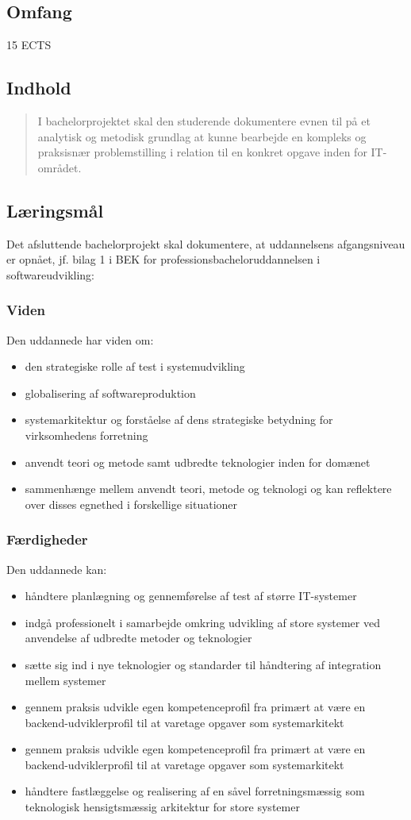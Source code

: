 \documentclass{article}
\begin{document}
\subsection{Omfang}
15 ECTS

\subsection{Indhold}
\begin{quote}
I bachelorprojektet skal den studerende dokumentere evnen til på et
analytisk og metodisk grundlag at kunne bearbejde en kompleks og praksisnær
problemstilling i relation til en konkret opgave inden for IT-området. 
\end{quote}


\subsection{Læringsmål}
Det afsluttende bachelorprojekt skal dokumentere, at uddannelsens afgangsniveau er opnået, jf. bilag 1 i BEK for professionsbacheloruddannelsen i softwareudvikling:
\subsubsection{Viden}
Den uddannede har viden om:
\begin{itemize}
  \item den strategiske rolle af test i systemudvikling
  \item globalisering af softwareproduktion
  \item systemarkitektur og forståelse af dens strategiske betydning for virksomhedens forretning
  \item anvendt teori og metode samt udbredte teknologier inden for domænet
  \item sammenhænge mellem anvendt teori, metode og teknologi og kan reflektere over disses egnethed i forskellige situationer
\end{itemize}
\subsubsection{Færdigheder}
Den uddannede kan:
\begin{itemize}
\item håndtere planlægning og gennemførelse af test af større IT-systemer
\item indgå professionelt i samarbejde omkring udvikling af store systemer ved anvendelse af udbredte metoder og teknologier
\item sætte sig ind i nye teknologier og standarder til håndtering af integration mellem systemer
\item gennem praksis udvikle egen kompetenceprofil fra primært at være en
backend-udviklerprofil til at varetage opgaver som systemarkitekt
\item gennem praksis udvikle egen kompetenceprofil fra primært at være en
backend-udviklerprofil til at varetage opgaver som systemarkitekt
\item håndtere fastlæggelse og realisering af en såvel forretningsmæssig som
teknologisk hensigtsmæssig arkitektur for store systemer
\end{itemize}
\end{document}
